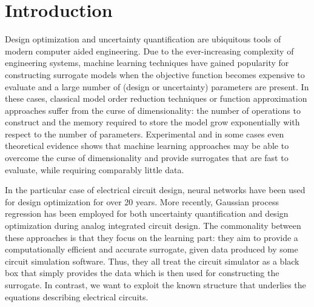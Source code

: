 \documentclass[AMA,STIX1COL]{WileyNJD-v2}
\begin{document}
\section{Introduction}
\label{sec:int}
Design optimization and uncertainty quantification are ubiquitous tools of modern computer aided  engineering. Due to the ever-increasing complexity of engineering systems, machine learning techniques have gained popularity for constructing surrogate models when the objective function becomes expensive to evaluate and a large number of (design or uncertainty) parameters are present. In these cases, classical model order reduction techniques\cite{schilders2008} or function approximation approaches\cite{xiu2010} suffer from the curse of dimensionality: the number of operations to construct and the memory required to store the model grow exponentially with respect to the number of parameters. Experimental and in some cases even theoretical evidence\cite{beneventano2020} shows that machine learning approaches may be able to overcome the curse of dimensionality and provide surrogates that are fast to evaluate, while requiring comparably little data.

In the particular case of electrical circuit design, neural networks have been used for design optimization for over 20 years\cite{zaabab1995,fang2000}. More recently, Gaussian process regression has been employed for both uncertainty quantification and design optimization during analog integrated circuit design\cite{wang2018,sanabria2020}. The commonality between these approaches is that they focus on the learning part: they aim to provide a computationally efficient and accurate surrogate, given data produced by some circuit simulation software. Thus, they all treat the circuit simulator as a black box that simply provides the data which is then used for constructing the surrogate. In contrast, we want to exploit the known structure that underlies the equations describing electrical circuits.
\end{document}
